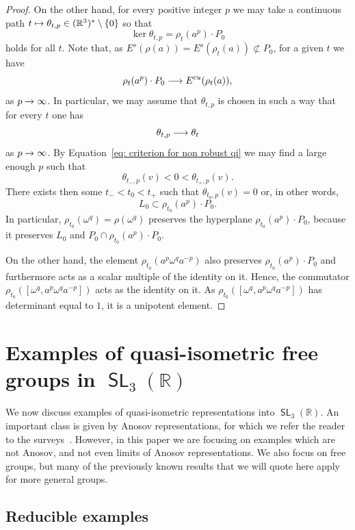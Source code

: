 \documentclass[AHL,Unicode,longabstracts]{cedram}
\DeclareMathOperator{\SL}{\mathsf{SL}}
\newcommand{\R}{\mathbb{R}}
\newcommand{\RR}{\R}
\newcommand{\Es}{E^s}
\newcommand{\Ecu}{E^{cu}}
\renewcommand*{\to}{\mathchoice{\longrightarrow}{\rightarrow}{\rightarrow}{\rightarrow}}
\let\oldmapsto\mapsto
\renewcommand*{\mapsto}{\mathchoice{\longmapsto}{\oldmapsto}{\oldmapsto}{\oldmapsto}}
\let\oldin\in
\renewcommand{\in}{\mathchoice{\oldin}{\oldin}{\,\oldin\,}{\,\oldin\,}}
\newcommand{\RR}{\mathbb{R}}
\begin{document}
\begin{proof}
On the other hand, for every positive integer $p$ we may take a continuous path $t\mapsto\theta_{t,p}\in(\RR^3)^*\setminus\{0\}$ so that
\[
\ker\theta_{t,p}=\rho_t(a^p)\cdot P_0
\]
holds for all $t$.
Note that, as $\Es(\rho(a))=\Es(\rho_t(a))\not\subset P_0$, for a given $t$ we have
\[
\rho_t(a^p)\cdot P_0\to\Ecu(\rho_t(a)),
\]
as $p\to\infty$.
In particular, we may assume that $\theta_{t,p}$ is chosen in such a way that for every $t$ one has
\[
\theta_{t,p}\to\theta_t
\]
as $p\to\infty$.
By Equation~\eqref{eq: criterion for non robust qi} we may find a large enough $p$ such that
\[
\theta_{t_-,p}(v)<0<\theta_{t_+,p}(v).
\]
There exists then some $t_-<t_0<t_+$ such that $\theta_{t_0,p}(v)=0$ or, in other words,
\[
L_0\subset \rho_{t_0}(a^{p})\cdot P_0.
\]
In particular, $\rho_{t_0}(\omega^q)=\rho(\omega^q)$ preserves the hyperplane $\rho_{t_0}(a^{p})\cdot P_0$, because it preserves $L_0$ and $P_0\cap\rho_{t_0}(a^{p})\cdot P_0$.

On the other hand, the element $\rho_{t_0}(a^p\omega^q a^{-p})$ also preserves $\rho_{t_0}(a^{p})\cdot P_0$ and furthermore acts as a scalar multiple of the identity on it. Hence, the commutator $\rho_{t_0}([\omega^q,a^p\omega^q a^{-p}])$ acts as the identity on it. As $ \rho_{t_0}([\omega^q,a^p\omega^q a^{-p}]) $ has determinant equal to $1$, it is a unipotent element.
\end{proof}



\section{Examples of quasi-isometric free groups in $\SL_3(\R)$}\label{sec: examples}


We now discuss examples of quasi-isometric representations into $\SL_3(\R)$. An important class is given by Anosov representations, for which we refer the reader to the surveys~\cite{kassel,weinhard}. However, in this paper we are focusing on examples which are not Anosov, and not even limits of Anosov representations. We also focus on free groups, but many of the previously known results that we will quote here apply for more general groups.


\subsection{Reducible examples}\label{ss.reducible}
\end{document}
